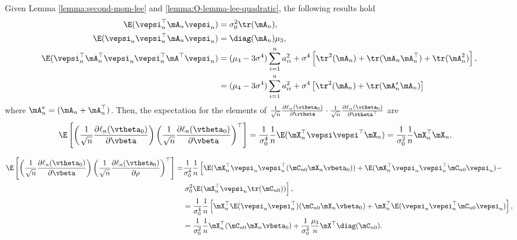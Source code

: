 \documentclass[english,12pt]{book}\usepackage[]{graphicx}\usepackage[]{xcolor}
\begin{document}
\begin{subappendices}
Given Lemma \ref{lemma:second-mom-lee} and \ref{lemma:O-lemma-lee-quadratic}, the following results hold
\begin{equation}\label{eq:moments-linear-cuadratic}
\begin{aligned}
  \E(\vepsi_n^\top\mA_n\vepsi_n) & = \sigma_0^2\tr(\mA_n), \\
  \E(\vepsi_n\vepsi_n^\top\mA_n\vepsi_n) & =  \diag(\mA_n)\mu_3, \\
\E(\vepsi_n^\top\mA_n^\top\vepsi_n\vepsi_n^\top\mA^\top\vepsi_n) & = (\mu_4 - 3\sigma^4)\sum_{i = 1}^na_{ii}^2 + \sigma^4\left[\tr^2(\mA_n) + \tr(\mA_n\mA_n^\top)+\tr(\mA_n^2)\right], \\
& = (\mu_4 - 3\sigma^4)\sum_{i = 1}^na_{ii}^2 + \sigma^4\left[\tr^2(\mA_n) + \tr(\mA_n^s\mA_n)\right] 
\end{aligned}
\end{equation}
%
where $\mA_n^s = (\mA_n + \mA_n^\top)$. Then, the expectation for the elements of $  \frac{1}{\sqrt{n}}\frac{\partial \ell_n (\vtheta_0)}{\partial \vtheta}\cdot\frac{1}{\sqrt{n}}\frac{\partial \ell_n (\vtheta_0)}{\partial \vtheta^\top}$ are
\begin{equation*}
\begin{aligned}
\E\left[\left(\frac{1}{\sqrt{n}}\frac{\partial \ell_n(\vtheta_0)}{\partial \vbeta}\right) \left(\frac{1}{\sqrt{n}}\frac{\partial \ell_n(\vtheta_0)}{\partial \vbeta}\right)^\top\right] & = \frac{1}{\sigma_0^4}\frac{1}{n}\E(\mX_n^\top\vepsi\vepsi^\top\mX_n) = \frac{1}{\sigma_0^2}\frac{1}{n}\mX_n^\top\mX_n.
\end{aligned}
\end{equation*}

\begin{equation*}
\begin{aligned}
\E\left[\left(\frac{1}{\sqrt{n}}\frac{\partial \ell_n(\vtheta_0)}{\partial \vbeta}\right) \left(\frac{1}{\sqrt{n}}\frac{\partial \ell_n(\vtheta_0)}{\partial \rho}\right)^\top\right]  = &  \frac{1}{\sigma_0^4}\frac{1}{n}\left[\E(\mX_n^\top\vepsi_n\vepsi_n^\top(\mC_{n0}\mX_n\vbeta_0)) + \E(\mX_n^\top\vepsi_n\vepsi_n^\top\mC_{n0}\vepsi_n) - \right. \\
& \left. \sigma_0^2\E(\mX_n^\top\vepsi_n\tr(\mC_{n0})) \right], \\
& = \frac{1}{\sigma_0^4}\frac{1}{n}\left[\mX_n^\top\E(\vepsi_n\vepsi_n^\top)(\mC_{n0}\mX_n\vbeta_0) + \mX_n^\top\E(\vepsi_n\vepsi_n^\top\mC_{n0}\vepsi_n)\right], \\
& = \frac{1}{\sigma_0^2}\frac{1}{n}\mX_n^\top(\mC_{n0}\mX_n\vbeta_0) + \frac{1}{\sigma_0^4}\frac{\mu_3}{n}\mX^\top\diag(\mC_{n0}).
\end{aligned}
\end{equation*}


\end{subappendices}
\end{document}
